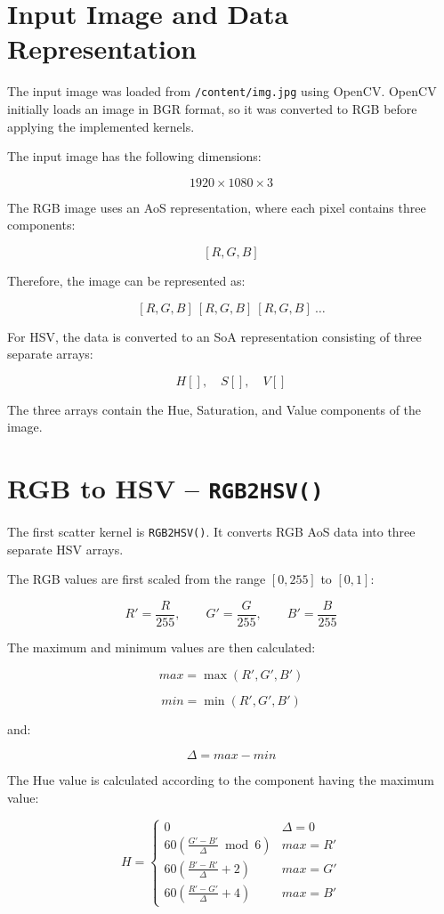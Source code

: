 \documentclass[11pt]{article}
\begin{document}
\section{Input Image and Data Representation}

The input image was loaded from \texttt{/content/img.jpg} using OpenCV. OpenCV initially loads an image in BGR format, so it was converted to RGB before applying the implemented kernels.

The input image has the following dimensions:

$$
1920 \times 1080 \times 3
$$

The RGB image uses an AoS representation, where each pixel contains three components:

$$
[R,G,B]
$$

Therefore, the image can be represented as:

$$
[R,G,B]\ [R,G,B]\ [R,G,B]\ \ldots
$$

For HSV, the data is converted to an SoA representation consisting of three separate arrays:

$$
H[],\quad S[],\quad V[]
$$

The three arrays contain the Hue, Saturation, and Value components of the image.

\section{RGB to HSV -- \texttt{RGB2HSV()}}

The first scatter kernel is \texttt{RGB2HSV()}. It converts RGB AoS data into three separate HSV arrays.

The RGB values are first scaled from the range $[0,255]$ to $[0,1]$:

$$
R'=\frac{R}{255},\qquad
G'=\frac{G}{255},\qquad
B'=\frac{B}{255}
$$

The maximum and minimum values are then calculated:

$$
max=\max(R',G',B')
$$

$$
min=\min(R',G',B')
$$

and:

$$
\Delta=max-min
$$

The Hue value is calculated according to the component having the maximum value:

$$
H=
\begin{cases}
0 & \Delta=0\\
60\left(\frac{G'-B'}{\Delta}\bmod6\right) & max=R'\\
60\left(\frac{B'-R'}{\Delta}+2\right) & max=G'\\
60\left(\frac{R'-G'}{\Delta}+4\right) & max=B'
\end{cases}
$$
\end{document}
